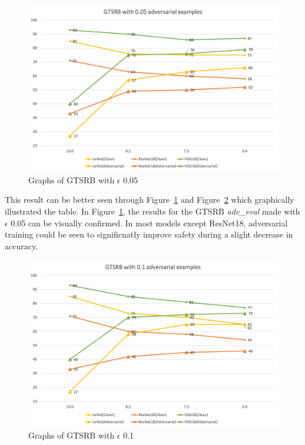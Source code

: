 \documentclass[journal,article,submit,moreauthors,pdftex]{Definitions/mdpi}
\begin{document}
\begin{figure}[H]
    \includegraphics[width=13 cm]{Definitions/graph-005gtsrb.png}
    \caption{Graphs of GTSRB with \begin{math}\epsilon\end{math} 0.05\label{gtsrb-0.05-graph}}
\end{figure} 

This result can be better seen through Figure~\ref{gtsrb-0.05-graph} and Figure~\ref{gtsrb-0.1-graph} which graphically illustrated the table.
In Figure~\ref{gtsrb-0.05-graph}, the results for the GTSRB {\it adv\_eval} made with \begin{math}\epsilon\end{math} 0.05 can be visually confirmed.
In most models except ResNet18, adversarial training could be seen to significnatly improve safety during a slight decrease in accuracy.

\begin{figure}[H]
    \includegraphics[width=13 cm]{Definitions/graph-01gtsrb.png}
    \caption{Graphs of GTSRB with \begin{math}\epsilon\end{math} 0.1\label{gtsrb-0.1-graph}}
\end{figure} 
\end{document}
